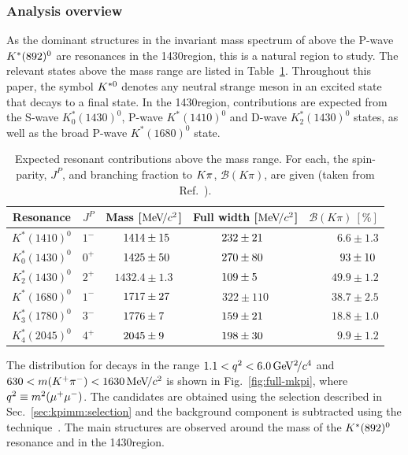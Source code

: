 \subsubsection{Analysis overview}

As the dominant structures in the \kpi invariant mass spectrum of \BdToKpimm above the P-wave ${{K}^*}(892)^{0}$ are resonances in the 1430\mevcc region, this is a natural region to study. The relevant \Kstarz states above the \KstP mass range are listed in Table~\ref{tab:introduction:states}. Throughout this paper, the symbol ${{K}^{*0}}$ denotes any neutral strange meson in an excited state that decays to a \Kp\pim final state. In the 1430\mevcc region, contributions are expected from the S-wave $K^\ast_0(1430)^0$, P-wave $K^\ast(1410)^0$ and D-wave $K^\ast_2(1430)^0$ states, as well as the broad P-wave $K^\ast(1680)^0$ state. 

\begin{table}[!tb]
\caption{Expected resonant contributions above the \KstP mass range. For each, the spin-parity, $J^P$, and branching fraction to ${K}{\pi}$, $\mathcal{B}(K\pi)$, are given (taken from Ref.~\cite{lu-wang}).}
\label{tab:introduction:states}
\centering
\begin{tabular}{c|c|c|c|r}
    Resonance & $J^{P}$ & Mass [$\mathrm{Me\kern -0.1em V\!/}c^2$] & Full width [$\mathrm{Me\kern -0.1em V\!/}c^2$]  & $\mathcal{B}(K\pi)~[\%]$ \\
   \hline
   $K^\ast(1410)^0$ & $1^{-}$& $\hphantom{0.}1414 \pm 15\hphantom{.}$& $232 \pm 21\hphantom{0}$  & $6.6 \pm 1.3$ \\
   $K^\ast_0(1430)^0$ & $0^{+}$ & $\hphantom{0.}1425 \pm 50\hphantom{.}$ & $270 \pm 80\hphantom{0}$ & $\hphantom{.}93 \pm 10\hphantom{.}$ \\
   $K^\ast_2(1430)^0$ & $2^{+}$ & $1432.4\pm 1.3$ & $109 \pm 5\hphantom{00}$ & $49.9 \pm 1.2$ \\
   $K^\ast(1680)^0$ & $1^{-}$ & $\hphantom{0.}1717 \pm 27\hphantom{.}$ & $322 \pm 110$ & $38.7 \pm 2.5$ \\
   $K^\ast_3(1780)^0$ & $3^{-}$ & $\hphantom{0.}1776 \pm 7\hphantom{0.}$ & $159 \pm 21\hphantom{0}$ & $18.8 \pm 1.0$ \\
   $K^\ast_4(2045)^0$ & $4^{+}$ & $\hphantom{0.}2045 \pm 9\hphantom{0.}$ & $198 \pm 30\hphantom{0}$ & $9.9 \pm 1.2$ \\
 \end{tabular}
 \end{table}

The \mkpi distribution for \BdToKpimm decays in the range $1.1<{q^2}<6.0{\mathrm{\,Ge\kern -0.1em V^2\!/}c^4}$ and $630<m({{K}^+}{{\pi}^-})<1630{\mathrm{\,Me\kern -0.1em V\!/}c^2}$ is shown in Fig.~\ref{fig:full-mkpi}, where ${q^2} \equiv m^2({\mu^+} {\mu^-})$. The candidates are obtained using the selection described in Sec.~\ref{sec:kpimm:selection} and the background component is subtracted using the \sPlot technique~\cite{splot}. The main structures are observed around the mass of the ${{K}^*}(892)^{0}$ resonance and in the 1430\mevcc region. 


